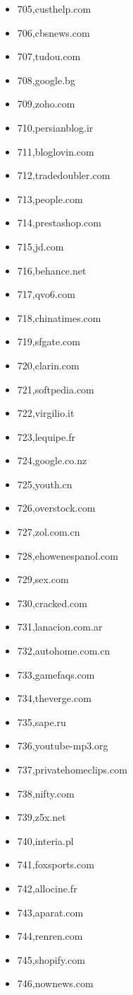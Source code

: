 \begin{multicols}{3}
\begin{itemize}
	\item 705,custhelp.com
	\item 706,cbsnews.com
	\item 707,tudou.com
	\item 708,google.bg
	\item 709,zoho.com
	\item 710,persianblog.ir
	\item 711,bloglovin.com
	\item 712,tradedoubler.com
	\item 713,people.com
	\item 714,prestashop.com
	\item 715,jd.com
	\item 716,behance.net
	\item 717,qvo6.com
	\item 718,chinatimes.com
	\item 719,sfgate.com
	\item 720,clarin.com
	\item 721,softpedia.com
	\item 722,virgilio.it
	\item 723,lequipe.fr
	\item 724,google.co.nz
	\item 725,youth.cn
	\item 726,overstock.com
	\item 727,zol.com.cn
	\item 728,ehowenespanol.com
	\item 729,sex.com
	\item 730,cracked.com
	\item 731,lanacion.com.ar
	\item 732,autohome.com.cn
	\item 733,gamefaqs.com
	\item 734,theverge.com
	\item 735,sape.ru
	\item 736,youtube-mp3.org
	\item 737,privatehomeclips.com
	\item 738,nifty.com
	\item 739,z5x.net
	\item 740,interia.pl
	\item 741,foxsports.com
	\item 742,allocine.fr
	\item 743,aparat.com
	\item 744,renren.com
	\item 745,shopify.com
	\item 746,nownews.com

\end{itemize}
\end{multicols}
